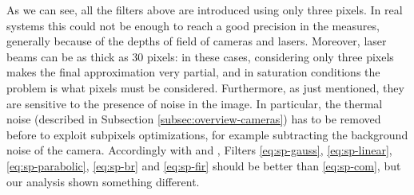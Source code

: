 \bigskip
As we can see, all the filters above are introduced using only three pixels. In real systems this could not be enough to reach a good precision in the measures, generally because of the depths of field of cameras and lasers. Moreover, laser beams can be as thick as $30$ pixels: in these cases, considering only three pixels makes the final approximation very partial, and in saturation conditions the problem is what pixels must be considered. Furthermore, as just mentioned, they are sensitive to the presence of noise in the image. In particular, the thermal noise (described in Subsection \ref{subsec:overview-cameras}) has to be removed before to exploit subpixels optimizations, for example subtracting the background noise of the camera.
Accordingly with \cite{1334612} and \cite{Naidu1991}, Filters \ref{eq:sp-gauss}, \ref{eq:sp-linear}, \ref{eq:sp-parabolic}, \ref{eq:sp-br} and \ref{eq:sp-fir} should be better than \ref{eq:sp-com}, but our analysis shown something different.
